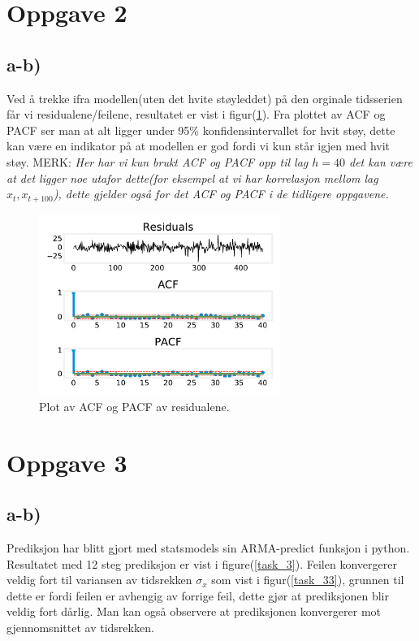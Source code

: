 \section{Oppgave 2}
\subsection{a-b)}

Ved å trekke ifra modellen(uten det hvite støyleddet) på den orginale tidsserien får vi residualene/feilene, resultatet er vist i figur(\ref{task_2a}). Fra plottet av ACF og PACF ser man at alt ligger under 95\% konfidensintervallet for hvit støy, dette kan være en indikator på at modellen er god fordi vi kun står igjen med hvit støy. MERK: \emph{Her har vi kun brukt ACF og PACF opp til lag $h = 40$ det kan være at det ligger noe utafor dette(for eksempel at vi har korrelasjon mellom lag $x_{t}, x_{t+100}$), dette gjelder også for det ACF og PACF i de tidligere oppgavene.}

\begin{figure}[hbt!]
    {\centering
        \includegraphics[width=0.70\textwidth]{task_2a.pdf}
        \caption{Plot av ACF og PACF av residualene.}
        \label{task_2a}
    \par}
    \end{figure}






\section{Oppgave 3}
\subsection{a-b)}

Prediksjon har blitt gjort med statsmodels sin ARMA-predict funksjon i python. Resultatet med 12 steg prediksjon er vist i figure(\ref{task_3}). Feilen konvergerer veldig fort til variansen av tidsrekken $\sigma_{x}$ som vist i figur(\ref{task_33}), grunnen til dette er fordi feilen er avhengig av forrige feil, dette gjør at prediksjonen blir veldig fort dårlig. Man kan også observere at prediksjonen konvergerer mot gjennomsnittet av tidsrekken.


